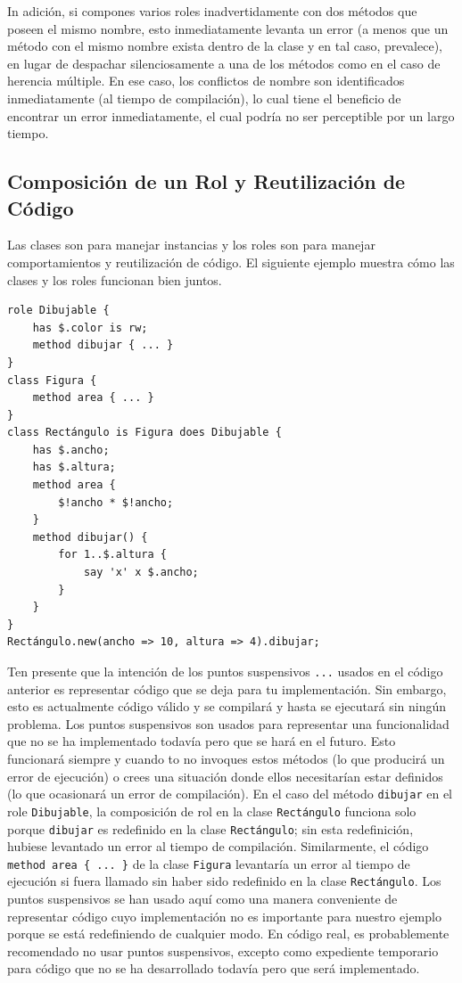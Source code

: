 
In adición, si compones varios roles inadvertidamente con dos
métodos que poseen el mismo nombre, esto inmediatamente levanta
un error (a menos que un método con el mismo nombre exista dentro
de la clase y en tal caso, prevalece), en lugar de despachar silenciosamente
a una de los métodos como en el caso de herencia múltiple. En 
ese caso, los conflictos de nombre son identificados inmediatamente
(al tiempo de compilación), lo cual tiene el beneficio de 
encontrar un error inmediatamente, el cual podría no ser
perceptible por un largo tiempo.

\subsection{Composición de un Rol y Reutilización de Código}

Las clases son para manejar instancias y los roles son para
manejar comportamientos y reutilización de código. El siguiente
ejemplo muestra cómo las clases y los roles funcionan bien juntos.

\begin{lstlisting}
role Dibujable {
    has $.color is rw;
    method dibujar { ... }
}
class Figura {
    method area { ... }
}
class Rectángulo is Figura does Dibujable {
    has $.ancho;
    has $.altura;
    method area {
        $!ancho * $!ancho;
    }
    method dibujar() {
        for 1..$.altura {
            say 'x' x $.ancho;
        }
    }
}
Rectángulo.new(ancho => 10, altura => 4).dibujar;
\end{lstlisting}

Ten presente que la intención de los puntos suspensivos
\verb|...| usados en el código anterior es representar
código que se deja para tu implementación. Sin embargo, esto
es actualmente código válido y se compilará y hasta se 
ejecutará sin ningún problema. Los puntos suspensivos 
son usados para representar una funcionalidad que no se ha
implementado todavía pero que se hará en el futuro. Esto funcionará
siempre y cuando to no invoques estos métodos (lo que producirá un 
error de ejecución) o crees una situación donde ellos necesitarían
estar definidos (lo que ocasionará un error de compilación).
En el caso del método {\tt dibujar} en el role {\tt Dibujable},
la composición de rol en la clase {\tt Rectángulo} funciona
solo porque {\tt dibujar} es redefinido en la clase {\tt Rectángulo};
sin esta redefinición, hubiese levantado un error al tiempo de
compilación. Similarmente, el código \verb|method area { ... }|
de la clase {\tt Figura} levantaría un error al tiempo de
ejecución si fuera llamado sin haber sido redefinido en
la clase {\tt Rectángulo}. Los puntos suspensivos se han usado 
aquí como una manera conveniente de representar código cuyo 
implementación no es importante para nuestro ejemplo porque se está
redefiniendo de cualquier modo. En código real, es probablemente
recomendado no usar puntos suspensivos, excepto como expediente temporario
para código que no se ha desarrollado todavía pero que será
implementado.

